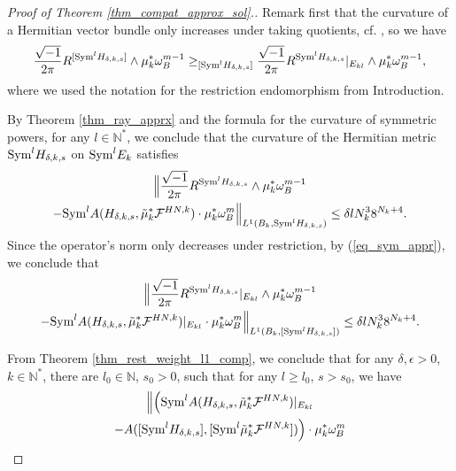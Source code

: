 \documentclass[12pt]{article}
\numberwithin{equation}{section}
\theoremstyle{theorem}
\theoremstyle{definition}
\theoremstyle{remark}
\newcommand{\imun} {\sqrt{-1}}
\newcommand{\nat}{\mathbb{N}}
\begin{document}
	
	\begin{proof}[Proof of Theorem \ref{thm_compat_approx_sol}.]
		Remark first that the curvature of a Hermitian vector bundle only increases under taking quotients, cf. \cite[Theorem V.14.5]{DemCompl}, so we have 
		\begin{equation}\label{eq_curv_incccc}
			\frac{\imun}{2 \pi} R^{[{\rm{Sym}}^l H_{\delta, k, s}]} \wedge \mu_k^* \omega_B^{m - 1}
			\geq_{[{\rm{Sym}}^l H_{\delta, k, s}]}
			\frac{\imun}{2 \pi} R^{{\rm{Sym}}^l H_{\delta, k, s}}|_{E_{kl}} \wedge \mu_k^* \omega_B^{m - 1},
		\end{equation}
		where we used the notation for the restriction endomorphism from Introduction.
		\par 
		By Theorem \ref{thm_ray_apprx} and the formula for the curvature of symmetric powers, for any $l \in \nat^*$, we conclude that the curvature of the Hermitian metric ${\rm{Sym}}^l H_{\delta, k, s}$ on ${\rm{Sym}}^l E_k$ satisfies
		\begin{multline}\label{eq_sym_appr}
		\Big\|  
			 \frac{\imun}{2 \pi} R^{{\rm{Sym}}^l H_{\delta, k, s}} \wedge \mu_k^* \omega_B^{m - 1} 
			 \\
			 - {\rm{Sym}}^l A(H_{\delta, k, s}, \tilde{\mu}_k^* \mathcal{F}^{HN, k}) \cdot \mu_k^* \omega_B^m
		\Big\|_{L^1(B_k, {\rm{Sym}}^l H_{\delta, k, s})} \leq \delta l N_k^3 8^{N_k + 4}.
		\end{multline}
		Since the operator's norm only decreases under restriction, by (\ref{eq_sym_appr}), we conclude that
		\begin{multline}\label{eq_sym_appr0101}
		\Big\|  
			 \frac{\imun}{2 \pi} R^{{\rm{Sym}}^l H_{\delta, k, s}}|_{E_{kl}} \wedge \mu_k^* \omega_B^{m - 1} 
			 \\
			 - {\rm{Sym}}^l A(H_{\delta, k, s}, \tilde{\mu}_k^* \mathcal{F}^{HN, k})|_{E_{kl}} \cdot \mu_k^* \omega_B^m
		\Big\|_{L^1(B_k, [{\rm{Sym}}^l H_{\delta, k, s}])} \leq \delta l N_k^3 8^{N_k + 4}.
		\end{multline}
		\par 
		From Theorem \ref{thm_rest_weight_l1_comp}, we conclude that for any $\delta, \epsilon > 0$, $k \in \nat^*$, there are $l_0 \in \nat$, $s_0 > 0$, such that for any $l \geq l_0$, $s > s_0$, we have
		\begin{multline}\label{eq_sym_appr01012}
			\Big\|  
				\Big(
			 {\rm{Sym}}^l A(H_{\delta, k, s}, \tilde{\mu}_k^* \mathcal{F}^{HN, k})|_{E_{kl}}
			 \\
			 - A( [{\rm{Sym}}^l H_{\delta, k, s}], [ {\rm{Sym}}^l \tilde{\mu}_k^* \mathcal{F}^{HN, k}]) \Big) \cdot \mu_k^* \omega_B^m

\end{multline}
\end{proof}
\end{document}
